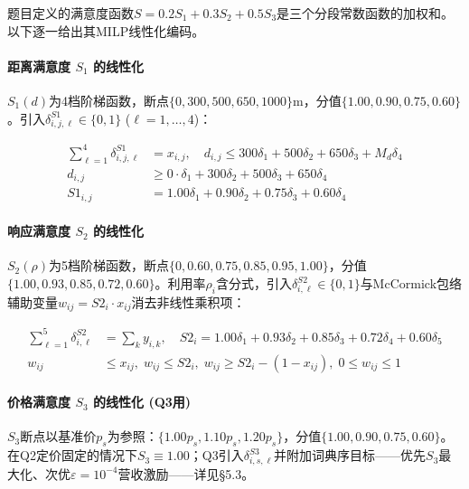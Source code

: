 题目定义的满意度函数$S = 0.2S_1 + 0.3S_2 + 0.5S_3$是三个分段常数函数的加权和。以下逐一给出其MILP线性化编码。

\paragraph{距离满意度 $S_1$ 的线性化}

$S_1(d)$为4档阶梯函数，断点$\{0,300,500,650,1000\}$m，分值$\{1.00,0.90,0.75,0.60\}$。引入$\delta_{i,j,\ell}^{S1}\in\{0,1\}$ ($\ell=1,\dots,4$)：

\begin{equation}
\begin{aligned}
\sum_{\ell=1}^{4} \delta_{i,j,\ell}^{S1} &= x_{i,j}, \quad d_{i,j} \le 300\delta_1 + 500\delta_2 + 650\delta_3 + M_d\delta_4 \\
d_{i,j} &\ge 0\cdot\delta_1 + 300\delta_2 + 500\delta_3 + 650\delta_4 \\
S1_{i,j} &= 1.00\delta_1 + 0.90\delta_2 + 0.75\delta_3 + 0.60\delta_4
\end{aligned}
\end{equation}

\paragraph{响应满意度 $S_2$ 的线性化}

$S_2(\rho)$为5档阶梯函数，断点$\{0,0.60,0.75,0.85,0.95,1.00\}$，分值$\{1.00,0.93,0.85,0.72,0.60\}$。利用率$\rho_i$含分式，引入$\delta_{i,\ell}^{S2}\in\{0,1\}$与McCormick包络辅助变量$w_{ij}=S2_i\cdot x_{ij}$消去非线性乘积项\cite{mccormick1976}：

\begin{equation}
\begin{aligned}
\sum_{\ell=1}^{5} \delta_{i,\ell}^{S2} &= \sum_{k} y_{i,k}, \quad S2_i = 1.00\delta_1 + 0.93\delta_2 + 0.85\delta_3 + 0.72\delta_4 + 0.60\delta_5 \\[4pt]
w_{ij} &\le x_{ij},\; w_{ij} \le S2_i,\; w_{ij} \ge S2_i - (1-x_{ij}),\; 0 \le w_{ij} \le 1
\end{aligned}
\end{equation}

\paragraph{价格满意度 $S_3$ 的线性化 (Q3用)}

$S_3$断点以基准价$p_s$为参照：$\{1.00p_s,1.10p_s,1.20p_s\}$，分值$\{1.00,0.90,0.75,0.60\}$。在Q2定价固定的情况下$S_3\equiv1.00$；Q3引入$\delta_{i,s,\ell}^{S3}$并附加词典序目标——优先$S_3$最大化、次优$\varepsilon=10^{-4}$营收激励——详见§5.3。

